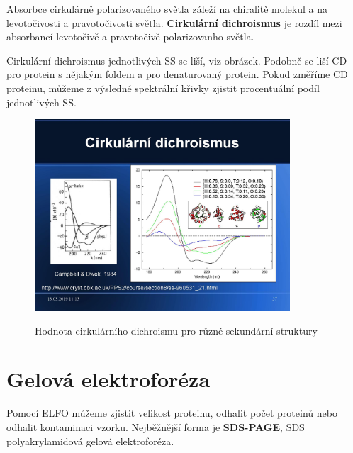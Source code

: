 \documentclass[DIV=8]{scrreprt}
\begin{document}
Absorbce cirkulárně polarizovaného světla záleží na chiralitě molekul a na levotočivosti a pravotočivosti světla. \textbf{Cirkulární dichroismus} je rozdíl mezi absorbancí levotočivě a pravotočivě polarizovanho světla.

Cirkulární dichroismus jednotlivých SS se liší, viz obrázek. Podobně se liší CD pro protein s nějakým foldem a pro denaturovaný protein. Pokud změříme CD proteinu, můžeme z výsledné spektrální křivky zjistit procentuální podíl jednotlivých SS.

\begin{figure}
    \caption{Hodnota cirkulárního dichroismu pro různé sekundární struktury}
    \includegraphics[width=0.85\textwidth]{slides-2/slide-55.jpg}
    \centering
    \label{}
\end{figure}


\section{Gelová elektroforéza} \label{Gelová elektroforéza} \FloatBarrier


Pomocí ELFO můžeme zjistit velikost proteinu, odhalit počet proteinů nebo odhalit kontaminaci vzorku. Nejběžnější forma je \textbf{SDS-PAGE}, SDS polyakrylamidová gelová elektroforéza.
\end{document}
